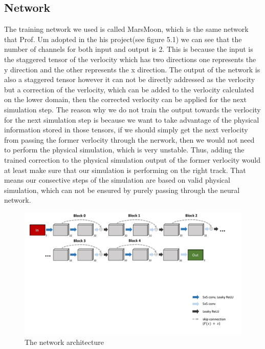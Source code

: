 \documentclass[a4paper,12pt,twoside]{report}
\begin{document}
\subsection{Network}
The training network we used is called MarsMoon, which is the same network that Prof. Um adopted in the his project(see figure 5.1) we can see that the number of channels for both input and output is 2. This is because the input is the staggered tensor of the verlocity which has two directions one represents the y direction and the other represents the x direction. The output of the network is also a staggered tensor however it can not be directly addressed as the verlocity but a correction of the verlocity, which can be added to the verlocity calculated on the lower domain, then the corrected verlocity can be applied for the next simulation step. The reason why we do not train the output towards the verlocity for the next simulation step is because we want to take advantage of the physical information stored in those tensors, if we should simply get the next verlocity from passing the former verlocity through the nerwork, then we would not need to perform the physical simulation, which is very unstable. Thus, adding the trained correction to the physical simulation output of the former verlocity would at least make sure that our simulation is performing on the right track. That means our consective steps of the simulation are based on valid physical simulation, which can not be ensured by purely passing through the neural network.
\begin{figure}
\centering
\includegraphics[width=1.0\textwidth]{marsmoon.pdf}
\caption{The network architecture\cite{um2020sol}}
\end{figure}
\end{document}
